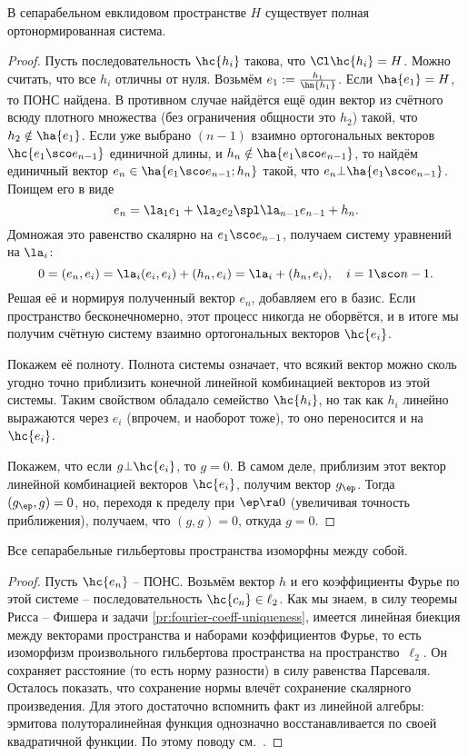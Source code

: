 \documentclass[a4paper]{article}
\begin{document}
\begin{theorem}
В сепарабельном евклидовом пространстве $H$ существует полная ортонормированная система.
\end{theorem}
\begin{proof}
Пусть последовательность $\hc{h_i}$ такова, что $\Cl \hc{h_i} = H$. Можно считать,
что все $h_i$ отличны от нуля.
Возьмём $e_1 := \frac{h_1}{\hn{h_1}}$.
Если $\ha{e_1} = H$, то ПОНС найдена. В противном случае
найдётся ещё один вектор из счётного всюду плотного множества (без ограничения
общности это $h_2$) такой, что $h_2 \notin \ha{e_1}$. Если уже
выбрано $(n-1)$ взаимно ортогональных векторов $\hc{e_1\sco e_{n-1}}$ единичной
длины, и $h_n \notin \ha{e_1\sco e_{n-1}}$,
то найдём единичный вектор $e_n \in \ha{e_1\sco e_{n-1}; h_n}$ такой, что $e_n \bot \ha{e_1\sco e_{n-1}}$.
Поищем его в виде
$$e_n = \la_1 e_1 + \la_2 e_2 \spl \la_{n-1}e_{n-1} + h_n.$$
Домножая это равенство скалярно на $e_1\sco e_{n-1}$, получаем систему уравнений на $\la_i$:
$$0 = (e_n, e_i) = \la_i (e_i, e_i) + (h_n, e_i) = \la_i + (h_n, e_i), \quad i = 1\sco n-1.$$
Решая её и нормируя полученный вектор $e_n$, добавляем его в базис.
Если пространство бесконечномерно, этот процесс никогда не оборвётся, и в итоге мы получим
счётную систему взаимно ортогональных векторов $\hc{e_i}$.

Покажем её полноту.
Полнота системы означает, что всякий вектор можно сколь угодно точно приблизить
конечной линейной комбинацией векторов из этой системы. Таким свойством обладало семейство $\hc{h_i}$,
но так как $h_i$ линейно выражаются через $e_i$ (впрочем, и наоборот тоже), то оно переносится и на $\hc{e_i}$.

Покажем, что если $g \bot \hc{e_i}$, то $g = 0$.
В самом деле, приблизим этот вектор линейной комбинацией векторов $\hc{e_i}$, получим
вектор $g_\ep$. Тогда $(g_\ep, g) = 0$, но, переходя
к пределу при $\ep \ra 0$ (увеличивая точность приближения), получаем, что $(g,g) = 0$, откуда $g = 0$.
\end{proof}

\begin{theorem}
Все сепарабельные гильбертовы пространства изоморфны между собой.
\end{theorem}
\begin{proof}
Пусть $\hc{e_n}$ -- ПОНС.
Возьмём вектор $h$ и его коэффициенты Фурье по этой системе -- последовательность $\hc{c_n} \in \ell_2$.
Как мы знаем, в силу теоремы Рисса -- Фишера и задачи \ref{pr:fourier-coeff-uniqueness},
имеется линейная биекция между векторами пространства и наборами коэффициентов Фурье,
то есть изоморфизм произвольного гильбертова пространства на пространство~$\ell_2$.
Он сохраняет расстояние (то есть норму разности) в силу равенства Парсеваля.
Осталось показать, что сохранение нормы влечёт сохранение скалярного произведения.
Для этого достаточно вспомнить факт из линейной алгебры: эрмитова полуторалинейная
функция однозначно восстанавливается по своей квадратичной функции. По этому поводу
см.~\cite[гл. 5, \S 5]{vinberg}.
\end{proof}
\end{document}
